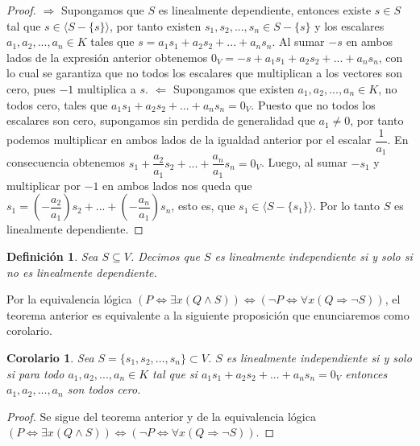 \documentclass{book}
\newtheorem{definition}{Definición}
\newtheorem{corollary}{Corolario}
\begin{document}
\begin{proof}
$\Rightarrow$ Supongamos que $S$ es linealmente dependiente, entonces existe $s \in S$ tal que $s \in \langle S-\{ s \} \rangle$, por tanto existen $s_1,s_2,...,s_n \in S-\{s\}$ y los escalares $a_1,a_2,...,a_n \in K$ tales que $s=a_1s_1+a_2s_2+...+a_ns_n$. Al sumar $-s$ en ambos lados de la expresión anterior obtenemos $0_V=-s+a_1s_1+a_2s_2+...+a_ns_n$, con lo cual se garantiza que no todos los escalares que multiplican a los vectores son cero, pues $-1$ multiplica a $s$.\newline \newline
$\Leftarrow$ Supongamos que existen $a_1,a_2,...,a_n \in K$, no todos cero, tales que $a_1s_1+a_2s_2+...+a_ns_n=0_V$. Puesto que no todos los escalares son cero, supongamos sin perdida de generalidad que $a_1\neq 0$, por tanto podemos multiplicar en ambos lados de la igualdad anterior por el escalar $\dfrac{1}{a_1}$. En consecuencia obtenemos $s_1+\dfrac{a_2}{a_1}s_2+...+\dfrac{a_n}{a_1} s_n=0_V$. Luego, al sumar $-s_1$ y multiplicar por $-1$ en ambos lados nos queda que $s_1=\left(-\dfrac{a_2}{a_1}\right) s_2+...+\left( - \dfrac{a_n}{a_1}\right) s_n$, esto es, que $s_1 \in \langle S -\{ s_1 \} \rangle$. Por lo tanto $S$ es linealmente dependiente.
\end{proof}

\begin{definition}
Sea $S \subseteq V$. Decimos que $S$ es linealmente independiente si y solo si no es linealmente dependiente.
\end{definition}

Por la equivalencia lógica $(P \Leftrightarrow \exists x (Q \wedge S)) \Leftrightarrow (\neg P \Leftrightarrow \forall x (Q\Rightarrow \neg S))$, el teorema anterior es equivalente a la siguiente proposición que enunciaremos como corolario.

\begin{corollary}
Sea $S=\{s_1,s_2,...,s_n\}\subset V$. $S$ es linealmente independiente si y solo si para todo $a_1,a_2,...,a_n \in K$ tal que si $a_1s_1+a_2s_2+...+a_ns_n=0_V$ entonces $a_1,a_2,...,a_n$ son todos cero.
\end{corollary}

\begin{proof}
Se sigue del teorema anterior y de la equivalencia lógica $(P \Leftrightarrow \exists x (Q \wedge S)) \Leftrightarrow (\neg P \Leftrightarrow \forall x (Q\Rightarrow \neg S))$.
\end{proof}
\end{document}
